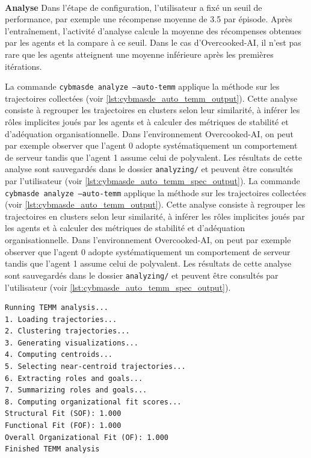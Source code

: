 \

\textbf{Analyse} \quad
Dans l'étape de configuration, l'utilisateur a fixé un seuil de performance, par exemple une récompense moyenne de 3.5 par épisode. Après l'entraînement, l'activité d'analyse  calcule la moyenne des récompenses obtenues par les agents et la compare à ce seuil. Dans le cas d'Overcooked-AI, il n'est pas rare que les agents atteignent une moyenne inférieure après les premières itérations.

La commande \texttt{cybmasde analyze --auto-temm} applique la méthode  sur les trajectoires collectées (voir \autoref{lst:cybmasde_auto_temm_output}). Cette analyse consiste à regrouper les trajectoires en clusters selon leur similarité, à inférer les rôles implicites joués par les agents et à calculer des métriques de stabilité et d'adéquation organisationnelle. Dans l'environnement Overcooked-AI, on peut par exemple observer que l'agent 0 adopte systématiquement un comportement de serveur tandis que l'agent 1 assume celui de polyvalent. Les résultats de cette analyse sont sauvegardés dans le dossier \texttt{analyzing/} et peuvent être consultés par l'utilisateur (voir \autoref{lst:cybmasde_auto_temm_spec_output}).
La commande \texttt{cybmasde analyze --auto-temm} applique la méthode  sur les trajectoires collectées (voir \autoref{lst:cybmasde_auto_temm_output}). Cette analyse consiste à regrouper les trajectoires en clusters selon leur similarité, à inférer les rôles implicites joués par les agents et à calculer des métriques de stabilité et d'adéquation organisationnelle. Dans l'environnement Overcooked-AI, on peut par exemple observer que l'agent 0 adopte systématiquement un comportement de serveur tandis que l'agent 1 assume celui de polyvalent. Les résultats de cette analyse sont sauvegardés dans le dossier \texttt{analyzing/} et peuvent être consultés par l'utilisateur (voir \autoref{lst:cybmasde_auto_temm_spec_output}).


\begin{lstlisting}[language={},basicstyle=\scriptsize, label={lst:cybmasde_auto_temm_output}, caption={Extrait de la sortie de log après entrainement et application de TEMM}]
Running TEMM analysis...
1. Loading trajectories...
2. Clustering trajectories...
3. Generating visualizations...
4. Computing centroids...
5. Selecting near-centroid trajectories...
6. Extracting roles and goals...
7. Summarizing roles and goals...
8. Computing organizational fit scores...
Structural Fit (SOF): 1.000
Functional Fit (FOF): 1.000
Overall Organizational Fit (OF): 1.000
Finished TEMM analysis
\end{lstlisting}


